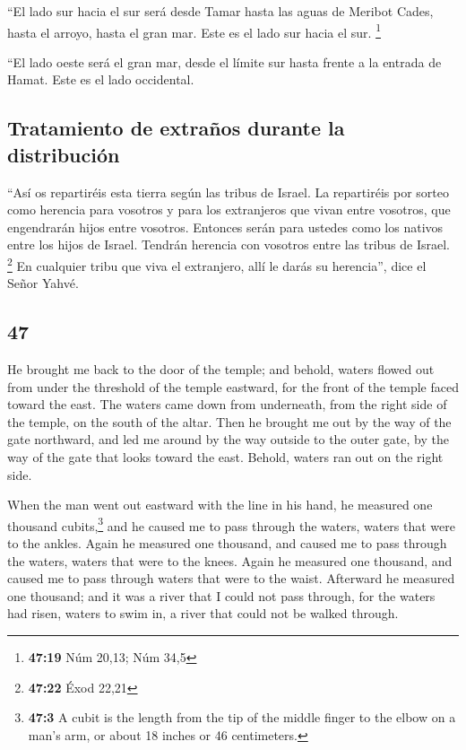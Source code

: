 \begin{paracol}{2}
 ``El lado sur hacia el sur será desde Tamar hasta las
aguas de Meribot Cades, hasta el arroyo, hasta el gran mar. Este es el
lado sur hacia el sur. \footnote{\textbf{47:19} Núm 20,13; Núm 34,5}

 ``El lado oeste será el gran mar, desde el límite sur
hasta frente a la entrada de Hamat. Este es el lado occidental.

\hypertarget{tratamiento-de-extrauxf1os-durante-la-distribuciuxf3n}{%
\subsection{Tratamiento de extraños durante la
distribución}\label{tratamiento-de-extrauxf1os-durante-la-distribuciuxf3n}}

 ``Así os repartiréis esta tierra según las tribus de
Israel.  La repartiréis por sorteo como herencia para
vosotros y para los extranjeros que vivan entre vosotros, que
engendrarán hijos entre vosotros. Entonces serán para ustedes como los
nativos entre los hijos de Israel. Tendrán herencia con vosotros entre
las tribus de Israel. \footnote{\textbf{47:22} Éxod 22,21}
 En cualquier tribu que viva el extranjero, allí le darás
su herencia'', dice el Señor Yahvé.

\switchcolumn
\begin{otherlanguage}{english}

\hypertarget{section-93}{%
\section{47}\label{section-93}}

 He brought me back to the door of the temple; and behold,
waters flowed out from under the threshold of the temple eastward, for
the front of the temple faced toward the east. The waters came down from
underneath, from the right side of the temple, on the south of the
altar.  Then he brought me out by the way of the gate
northward, and led me around by the way outside to the outer gate, by
the way of the gate that looks toward the east. Behold, waters ran out
on the right side.

 When the man went out eastward with the line in his hand,
he measured one thousand cubits,\footnote{\textbf{47:3} A cubit is the
  length from the tip of the middle finger to the elbow on a man's arm,
  or about 18 inches or 46 centimeters.} and he caused me to pass
through the waters, waters that were to the ankles.  Again
he measured one thousand, and caused me to pass through the waters,
waters that were to the knees. Again he measured one thousand, and
caused me to pass through waters that were to the waist. 
Afterward he measured one thousand; and it was a river that I could not
pass through, for the waters had risen, waters to swim in, a river that
could not be walked through.


\end{otherlanguage}
\end{paracol}
